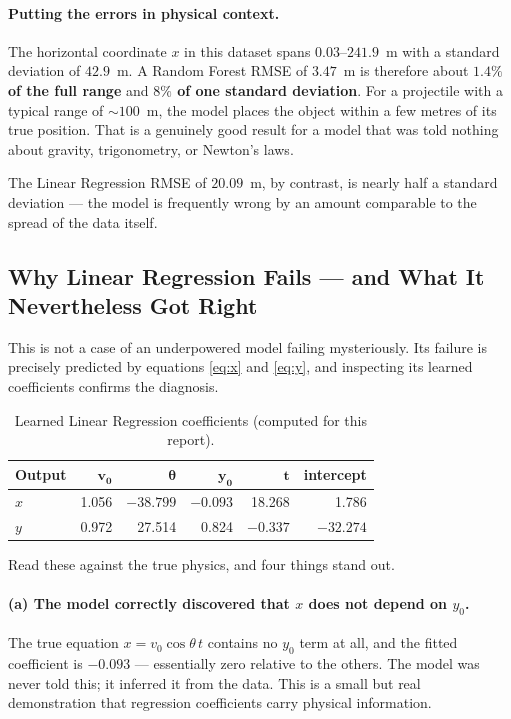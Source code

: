 \documentclass[11pt,a4paper]{article}
\newcommand{\vzero}{v_{0}}
\newcommand{\yzero}{y_{0}}
\begin{document}
\paragraph{Putting the errors in physical context.}
The horizontal coordinate $x$ in this dataset spans $0.03$--$241.9$~m with a standard deviation of
$42.9$~m. A Random Forest RMSE of $3.47$~m is therefore about \textbf{$1.4\%$ of the full range} and
\textbf{$8\%$ of one standard deviation}. For a projectile with a typical range of ${\sim}100$~m,
the model places the object within a few metres of its true position. That is a genuinely good
result for a model that was told nothing about gravity, trigonometry, or Newton's laws.

The Linear Regression RMSE of $20.09$~m, by contrast, is nearly half a standard deviation --- the
model is frequently wrong by an amount comparable to the spread of the data itself.

\subsection{Why Linear Regression Fails --- and What It Nevertheless Got Right}\label{sec:whylinearfails}

This is not a case of an underpowered model failing mysteriously. Its failure is precisely predicted
by equations \eqref{eq:x} and \eqref{eq:y}, and inspecting its learned coefficients confirms the
diagnosis.

\begin{table}[h]
\centering
\caption{Learned Linear Regression coefficients (computed for this report).}
\label{tab:coef}
\begin{tabular}{@{}lrrrrr@{}}
\toprule
\textbf{Output} & $\boldsymbol{\vzero}$ & $\boldsymbol{\theta}$ & $\boldsymbol{\yzero}$ &
$\boldsymbol{t}$ & \textbf{intercept} \\
\midrule
$x$ & 1.056 & $-38.799$ & $-0.093$ & 18.268 & 1.786 \\
$y$ & 0.972 & 27.514    & 0.824    & $-0.337$ & $-32.274$ \\
\bottomrule
\end{tabular}
\end{table}

Read these against the true physics, and four things stand out.

\paragraph{(a) The model correctly discovered that $x$ does not depend on $\yzero$.}
The true equation $x=\vzero\cos\theta\,t$ contains no $\yzero$ term at all, and the fitted
coefficient is $-0.093$ --- essentially zero relative to the others. The model was never told this;
it inferred it from the data. This is a small but real demonstration that regression coefficients
carry physical information.
\end{document}
